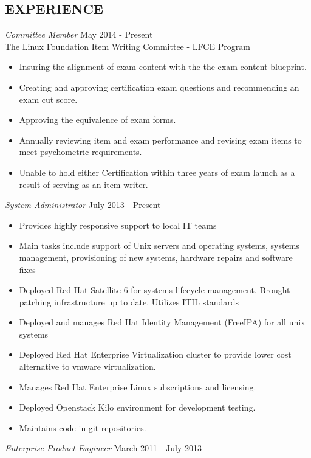 \documentclass[margin]{res}
\begin{document}
\begin{resume}
\section{EXPERIENCE}
	{\sl Committee Member} \hfill May 2014 - Present \\
    The Linux Foundation Item Writing Committee - LFCE Program
    \begin{itemize}  \itemsep -2pt %
    \item Insuring the alignment of exam content with the the exam content blueprint.
    \item Creating and approving certification exam questions and recommending an exam cut score.
    \item Approving the equivalence of exam forms.
    \item Annually reviewing item and exam performance and revising exam items to meet psychometric requirements.
    \item Unable to hold either Certification within three years of exam launch as a result of serving as an item writer.
    \end{itemize}
	{\sl System Administrator} \hfill July 2013 - Present \\
	\begin{itemize}  \itemsep -2pt %
		\item Provides highly responsive support to local IT teams
		\item Main tasks include support of Unix servers and operating systems, systems management, provisioning of new systems, hardware repairs and software fixes
		\item Deployed Red Hat Satellite 6 for systems lifecycle management. Brought patching infrastructure up to date. Utilizes ITIL standards
		\item Deployed and manages Red Hat Identity Management (FreeIPA) for all unix systems
		\item Deployed Red Hat Enterprise Virtualization cluster to provide lower cost alternative to vmware virtualization.
		\item Manages Red Hat Enterprise Linux subscriptions and licensing.
		\item Deployed Openstack Kilo environment for development testing.
		\item Maintains code in git repositories.
	\end{itemize}
 	{\sl Enterprise Product Engineer} \hfill March 2011 - July 2013 \\

\end{resume}
\end{document}
